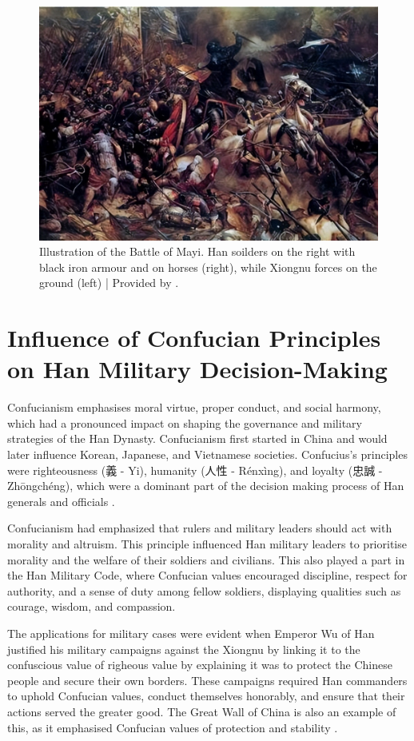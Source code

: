 \documentclass{ctexart}
\begin{document}
\begin{figure}
    \centering
    \includegraphics[scale=0.45]{1.jpg}
    \caption{Illustration of the Battle of Mayi. Han soilders on the right with black iron armour and on horses (right), while Xiongnu forces on the ground (left) | Provided by \cite{inews_2024_the}.}
    \label{fig:enter-label}
\end{figure}

\section{Influence of Confucian Principles on Han Military Decision-Making}
Confucianism emphasises moral virtue, proper conduct, and social harmony, which had a pronounced impact on shaping the governance and military strategies of the Han Dynasty. Confucianism first started in China and would later influence Korean, Japanese, and Vietnamese societies. Confucius’s principles were righteousness (義 - Yi), humanity (人性 - Rénxìng), and loyalty (忠誠 - Zhōngchéng), which were a dominant part of the decision making process of Han generals and officials \cite{csikszentmihalyi_2024_confucius}. 

Confucianism had emphasized that rulers and military leaders should act with morality and altruism. This principle influenced Han military leaders to prioritise morality and the welfare of their soldiers and civilians. This also played a part in the Han Military Code, where Confucian values encouraged discipline, respect for authority, and a sense of duty among fellow soldiers, displaying qualities such as courage, wisdom, and compassion.

The applications for military cases were evident when Emperor Wu of Han justified his military campaigns against the Xiongnu by linking it to the confuscious value of righeous value by explaining it was to protect the Chinese people and secure their own borders. These campaigns required Han commanders to uphold Confucian values, conduct themselves honorably, and ensure that their actions served the greater good. The Great Wall of China is also an example of this, as it emphasised Confucian values of protection and stability \cite{nylan_2001_the}.
\end{document}
